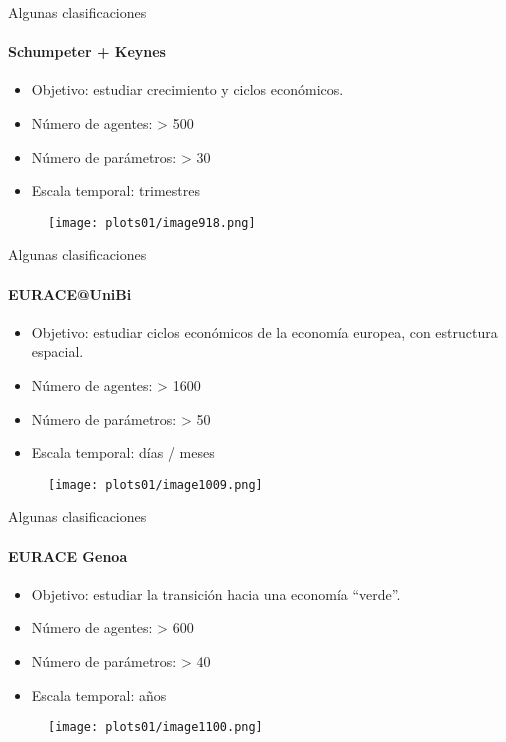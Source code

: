 \documentclass[11pt]{beamer}
\begin{document}
\begin{frame}{Algunas clasificaciones}
    \framesubtitle{Schumpeter + Keynes}
    \begin{itemize}
        \item Objetivo: estudiar crecimiento y ciclos económicos.
        \item Número de agentes: > 500
        \item Número de parámetros: > 30
        \item Escala temporal: trimestres
    \end{itemize}
    \begin{figure}
        \centering
        \texttt{[image: plots01/image918.png]}
        \label{fig:my_label}
    \end{figure}
\end{frame}


\begin{frame}{Algunas clasificaciones}
    \framesubtitle{EURACE@UniBi}
   \begin{itemize}
        \item Objetivo: estudiar ciclos económicos de la economía europea, con estructura espacial.
        \item Número de agentes: > 1600
        \item Número de parámetros: > 50
        \item Escala temporal: días / meses
    \end{itemize}
    \begin{figure}
        \centering
        \texttt{[image: plots01/image1009.png]}
        \label{fig:my_label}
    \end{figure}
\end{frame}

\begin{frame}{Algunas clasificaciones}
    \framesubtitle{EURACE Genoa}
   \begin{itemize}
        \item Objetivo: estudiar la transición hacia una economía ``verde''.
        \item Número de agentes: > 600
        \item Número de parámetros: > 40
        \item Escala temporal: años
    \end{itemize}
    \begin{figure}
        \centering
        \texttt{[image: plots01/image1100.png]}
        \label{fig:my_label}
    \end{figure}
\end{frame}
\end{document}
